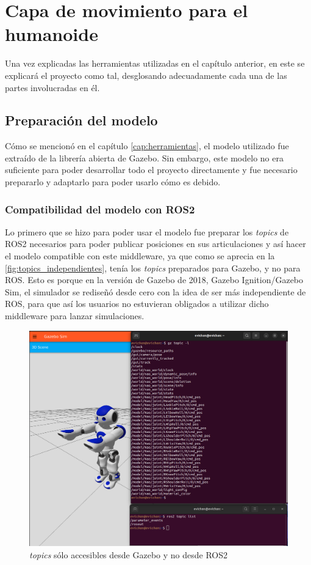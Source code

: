 \chapter{Capa de movimiento para el humanoide}\label{cap:capa_movimiento}

Una vez explicadas las herramientas utilizadas en el capítulo anterior, en este se explicará el proyecto como tal, desglosando adecuadamente cada una de las partes involucradas en él.

\section{Preparación del modelo} \label{sec:prep_modelo}

Cómo se mencionó en el capítulo \ref{cap:herramientas}, el modelo utilizado fue extraído de la librería abierta de Gazebo.
Sin embargo, este modelo no era suficiente para poder desarrollar todo el proyecto directamente y fue necesario prepararlo y adaptarlo para poder usarlo cómo es debido.

\subsection{Compatibilidad del modelo con ROS2}

Lo primero que se hizo para poder usar el modelo fue preparar los \textit{topics} de ROS2 necesarios para poder publicar posiciones en sus articulaciones y así hacer el modelo compatible con este middleware, ya que como se aprecia en la \autoref{fig:topics_independientes}, tenía los \textit{topics} preparados para Gazebo, y no para ROS. Esto es porque en la versión de Gazebo de 2018, Gazebo Ignition/Gazebo Sim, el simulador se rediseñó desde cero con la idea de ser más independiente de ROS, para que así los usuarios no estuvieran obligados a utilizar dicho middleware para lanzar simulaciones. 

\begin{figure}[H]
  \centering
  \includegraphics[width=1\textwidth]{figures/cap_4/topics_gazebo.png}
  \caption{\textit{topics} sólo accesibles desde Gazebo y no desde ROS2}
  \label{fig:topics_independientes}
\end{figure}

